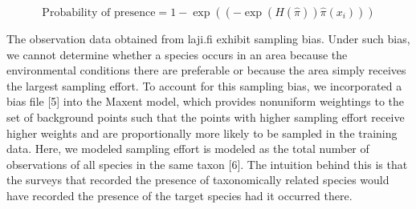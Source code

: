 \documentclass{article}
\begin{document}
\begin{equation}
	\text{Probability of presence} = 1 - \exp((-\exp(H(\hat{\pi}))\hat{\pi}(x_i)))
\end{equation}
\par
The observation data obtained from laji.fi exhibit sampling bias. Under such bias, we cannot determine whether a species occurs in an area because the environmental conditions there are preferable or because the area simply receives the largest sampling effort. To account for this sampling bias, we incorporated a bias file [5] into the Maxent model, which provides nonuniform weightings to the set of background points such that the points with higher sampling effort receive higher weights and are proportionally more likely to be sampled in the training data. Here, we modeled sampling effort is modeled as the total number of observations of all species in the same taxon [6]. The intuition behind this is that the surveys that recorded the presence of taxonomically related species would have recorded the presence of the target species had it occurred there.
\end{document}
